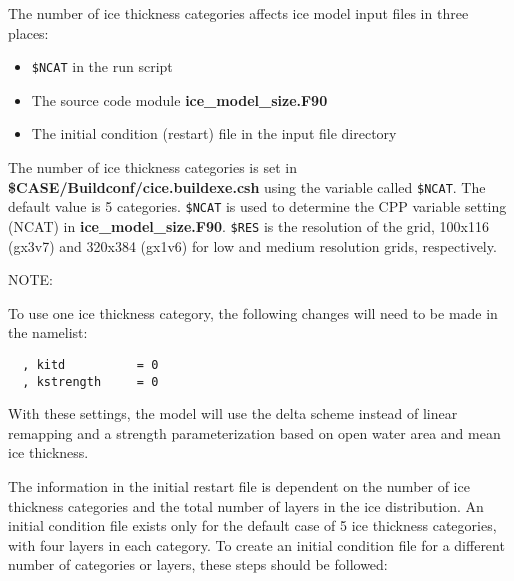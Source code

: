 
The number of ice thickness categories affects ice model input files in three
places:
  \begin{itemize}
    \item {\tt \$NCAT} in the run script
    \item The source code module {\bf ice\_model\_size.F90}
    \item The initial condition (restart) file in the input file directory
  \end{itemize}

The number of ice thickness categories is set in 
{\bf \$CASE/Buildconf/cice.buildexe.csh} using the variable 
called {\tt \$NCAT}.  The default value is 5 categories. {\tt \$NCAT} is 
used to determine the CPP variable setting (NCAT) in 
{\bf ice\_model\_size.F90}. {\tt \$RES} is the resolution of the grid, 
100x116 (gx3v7) and 320x384 (gx1v6) for low and medium resolution grids, 
respectively.

\begin{Ventry}{NOTE:}
\item[NOTE]
To use one ice thickness category, the following changes will need to be
made in the namelist: \\

\begin{verbatim}
  , kitd          = 0
  , kstrength     = 0
\end{verbatim}

With these settings, the model will use the delta scheme instead of linear
remapping and a strength parameterization based on open water area and
mean ice thickness.

\end{Ventry}

The information in the initial restart file is dependent on the number of
ice thickness categories and the total number of layers in the ice distribution.
An initial condition file exists only for the default case of 5 ice thickness
categories, with four layers in each category. To create an initial condition
file for a different number of categories or layers, these steps should be 
followed:

